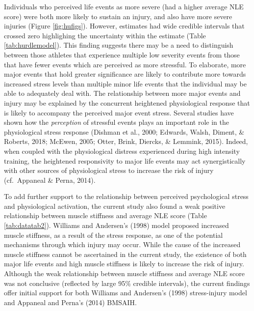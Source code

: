 \documentclass[man,floatsintext]{apa6}
\begin{document}
Individuals who perceived life events as more severe (had a higher average NLE score) were both more likely to sustain an injury, and also have more severe injuries (Figure \ref{fig:hufigs}).
However, estimates had wide credible intervals that crossed zero highlighing the uncertainty within the estimate (Table \ref{tab:hurdlemodel}).
This finding suggests there may be a need to distinguish between those athletes that experience multiple low severity events from those that have fewer events which are perceived as more stressful.
To elaborate, more major events that hold greater significance are likely to contribute more towards increased stress levels than multiple minor life events that the individual may be able to adequately deal with.
The relationship between more major events and injury may be explained by the concurrent heightened physiological response that is likely to accompany the perceived major event stress.
Several studies have shown how the \emph{perception} of stressful events plays an important role in the physiological stress response (Dishman et al., 2000; Edwards, Walsh, Diment, \& Roberts, 2018; McEwen, 2005; Otter, Brink, Diercks, \& Lemmink, 2015).
Indeed, when coupled with the physiological distress experienced during high intensity training, the heightened responsivity to major life events may act synergistically with other sources of physiological stress to increase the risk of injury (cf.~Appaneal \& Perna, 2014).

To add further support to the relationship between perceived psychological stress and physiological activation, the current study also found a weak positive relationship between muscle stiffness and average NLE score (Table \ref{tab:datatab2}).
Williams and Andersen's (1998) model proposed increased muscle stiffness, as a result of the stress response, as one of the potential mechanisms through which injury may occur.
While the cause of the increased muscle stiffness cannot be ascertained in the current study, the existence of both major life events and high muscle stiffness is likely to increase the risk of injury.
Although the weak relationship between muscle stiffness and average NLE score was not conclusive (reflected by large 95\% credible intervals), the current findings offer initial support for both Williams and Andersen's (1998) stress-injury model and Appaneal and Perna's (2014) BMSAIH.
\end{document}

